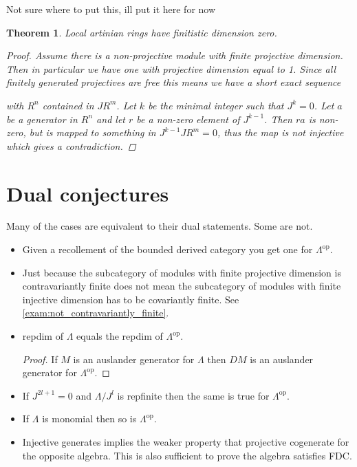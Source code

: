 \documentclass[11pt, a4paper, english]{article}
\newtheorem{theorem}{Theorem}[section]
\theoremstyle{definition}
\begin{document}
Not sure where to put this, ill put it here for now
\begin{theorem}
	Local artinian rings have finitistic dimension zero.
	\begin{proof}
		Assume there is a non-projective module with finite projective dimension. Then in particular we have one with projective dimension equal to 1. Since all finitely generated projectives are free this means we have a short exact sequence
		\begin{center}
		\end{center}
	with $R^n$ contained in $JR^m$. Let $k$ be the minimal integer such that $J^k=0$. Let $a$ be a generator in $R^n$ and let $r$ be a non-zero element of $J^{k-1}$. Then $ra$ is non-zero, but is mapped to something in $J^{k-1}JR^m=0$, thus the map is not injective which gives a contradiction. 
	\end{proof}
\end{theorem}

\section{Dual conjectures}

Many of the cases are equivalent to their dual statements. Some are not.
\begin{itemize}
	\item Given a recollement of the bounded derived category you get one for $\Lambda^{\operatorname{op}}$. 
	\item Just because the subcategory of modules with finite projective dimension is contravariantly finite does not mean the subcategory of modules with finite injective dimension has to be covariantly finite. See \cref{exam:not_contravariantly_finite}.
	\item repdim of $\Lambda$ equals the repdim of $\Lambda^{\operatorname{op}}$.
	\begin{proof}
		If $M$ is an auslander generator for $\Lambda$ then $DM$ is an auslander generator for $\Lambda^{\operatorname{op}}$.
	\end{proof}
	\item If $J^{2l+1} = 0$ and $\Lambda/J^l$ is repfinite then the same is true for $\Lambda^{\operatorname{op}}$.
	\item If $\Lambda$ is monomial then so is $\Lambda^{\operatorname{op}}$.
	\item Injective generates implies the weaker property that projective cogenerate for the opposite algebra. This is also sufficient to prove the algebra satisfies FDC.\cite[Section~5]{Rick19} 
\end{itemize}
\end{document}
